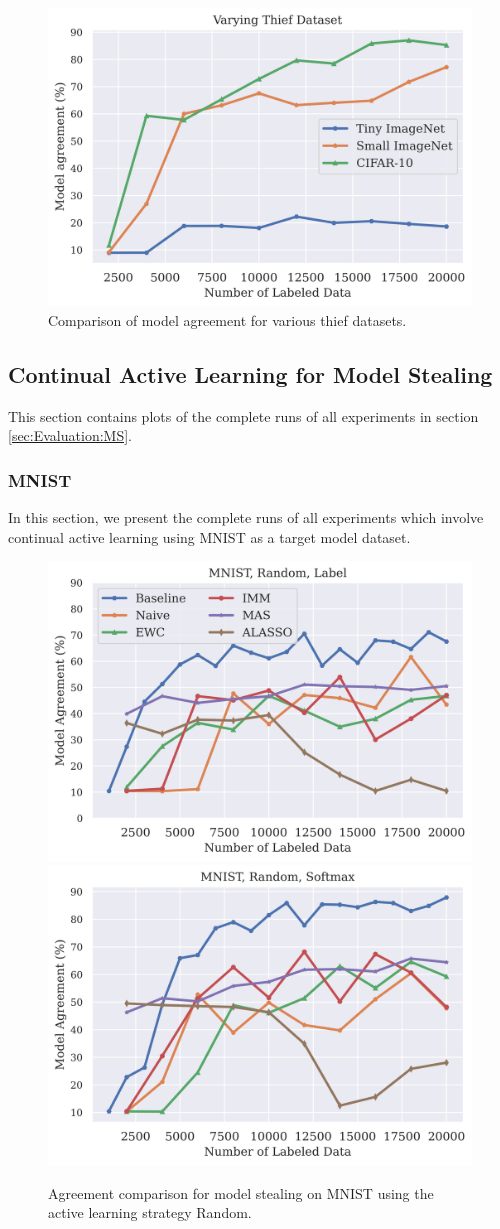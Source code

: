 \begin{figure}[!htb]
    \centering
    \includegraphics[width=0.8\linewidth]{images/results_CALMS/effect_dataset.png}
    \caption{Comparison of model agreement for various thief datasets.}
    \label{fig:Appendix:MS:ActiveThief:EffectDataset}
\end{figure}

\clearpage


\subsection{Continual Active Learning for Model Stealing}
\label{sec:Appendix:CALMS}
This section contains plots of the complete runs of all experiments in section \ref{sec:Evaluation:MS}.

\subsubsection{MNIST}
\label{sec:Appendix:CALMS:MNIST}
In this section, we present the complete runs of all experiments which involve continual active learning using MNIST as a target model dataset.

\begin{figure}[!htb]
    \centering
    \includegraphics[width=0.48\linewidth]{images/results_CALMS/mnist_label_random.png} \hfill
    \includegraphics[width=0.48\linewidth]{images/results_CALMS/mnist_softmax_random.png}
    \caption{Agreement comparison for model stealing on MNIST using the active learning strategy Random.}
    \label{fig:CALMSMNISTRandom}
\end{figure}

